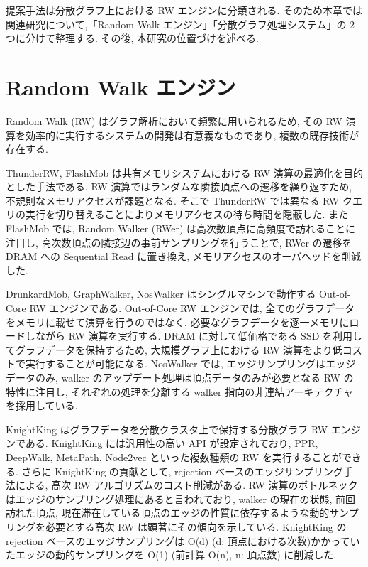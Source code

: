 
提案手法は分散グラフ上における RW エンジンに分類される. そのため本章では関連研究について,「Random Walk エンジン」「分散グラフ処理システム」の 2 つに分けて整理する. その後, 本研究の位置づけを述べる. 

\section{Random Walk エンジン}\label{sec:Random Walk エンジン}

Random Walk (RW) はグラフ解析において頻繁に用いられるため, その RW 演算を効率的に実行するシステムの開発は有意義なものであり, 複数の既存技術が存在する. 

ThunderRW\cite{10.14778/3476249.3476257}, FlashMob\cite{10.1145/3477132.3483575} は共有メモリシステムにおける RW 演算の最適化を目的とした手法である. RW 演算ではランダムな隣接頂点への遷移を繰り返すため, 不規則なメモリアクセスが課題となる. そこで ThunderRW では異なる RW クエリの実行を切り替えることによりメモリアクセスの待ち時間を隠蔽した. また FlashMob では, Random Walker (RWer) は高次数頂点に高頻度で訪れることに注目し, 高次数頂点の隣接辺の事前サンプリングを行うことで, RWer の遷移を DRAM への Sequential Read に置き換え, メモリアクセスのオーバヘッドを削減した. 

DrunkardMob\cite{10.1145/2507157.2507173}, GraphWalker\cite{254449}, NosWalker\cite{10.1145/3582016.3582025} はシングルマシンで動作する Out-of-Core RW エンジンである. Out-of-Core RW エンジンでは, 全てのグラフデータをメモリに載せて演算を行うのではなく, 必要なグラフデータを逐一メモリにロードしながら RW 演算を実行する. DRAM に対して低価格である SSD を利用してグラフデータを保持するため, 大規模グラフ上における RW 演算をより低コストで実行することが可能になる. NosWalker では, エッジサンプリングはエッジデータのみ, walker のアップデート処理は頂点データのみが必要となる RW の特性に注目し, それぞれの処理を分離する walker 指向の非連結アーキテクチャを採用している. 

KnightKing\cite{10.1145/3341301.3359634} はグラフデータを分散クラスタ上で保持する分散グラフ RW エンジンである. KnightKing には汎用性の高い API が設定されており, PPR, DeepWalk, MetaPath, Node2vec といった複数種類の RW を実行することができる. さらに KnightKing の貢献として, rejection ベースのエッジサンプリング手法による, 高次 RW アルゴリズムのコスト削減がある. RW 演算のボトルネックはエッジのサンプリング処理にあると言われており, walker の現在の状態, 前回訪れた頂点, 現在滞在している頂点のエッジの性質に依存するような動的サンプリングを必要とする高次 RW は顕著にその傾向を示している. KnightKing の rejection ベースのエッジサンプリングは O(d) (d: 頂点における次数)かかっていたエッジの動的サンプリングを O(1) (前計算 O(n), n: 頂点数) に削減した.

